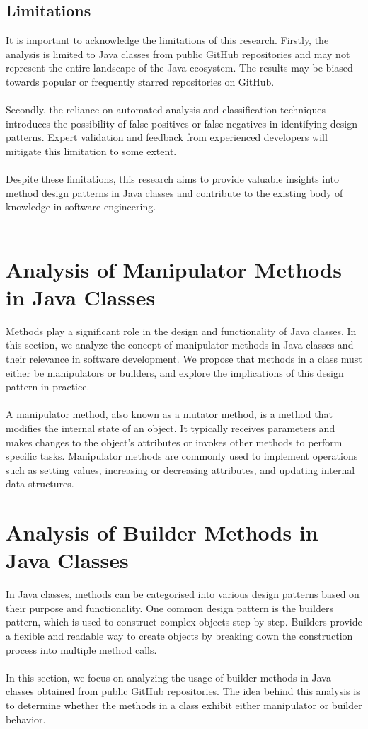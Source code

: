 \documentclass[draft]{article}
\begin{document}
\subsection{Limitations}
It is important to acknowledge the limitations of this research. Firstly, the analysis is limited to Java classes from public GitHub repositories and may not represent the entire landscape of the Java ecosystem. The results may be biased towards popular or frequently starred repositories on GitHub.\\
~\\
Secondly, the reliance on automated analysis and classification techniques introduces the possibility of false positives or false negatives in identifying design patterns. Expert validation and feedback from experienced developers will mitigate this limitation to some extent.\\
~\\
Despite these limitations, this research aims to provide valuable insights into method design patterns in Java classes and contribute to the existing body of knowledge in software engineering.\\
~\\

\newpage
\section{Analysis of Manipulator Methods in Java Classes}
Methods play a significant role in the design and functionality of Java classes. In this section, we analyze the concept of manipulator methods in Java classes and their relevance in software development. We propose that methods in a class must either be manipulators or builders, and explore the implications of this design pattern in practice.\\
~\\
A manipulator method, also known as a mutator method, is a method that modifies the internal state of an object. It typically receives parameters and makes changes to the object's attributes or invokes other methods to perform specific tasks. Manipulator methods are commonly used to implement operations such as setting values, increasing or decreasing attributes, and updating internal data structures.\\

\newpage
\section{Analysis of Builder Methods in Java Classes}
In Java classes, methods can be categorised into various design patterns based on their purpose and functionality. One common design pattern is the builders pattern, which is used to construct complex objects step by step. Builders provide a flexible and readable way to create objects by breaking down the construction process into multiple method calls.\\
~\\
In this section, we focus on analyzing the usage of builder methods in Java classes obtained from public GitHub repositories. The idea behind this analysis is to determine whether the methods in a class exhibit either manipulator or builder behavior.
\end{document}
